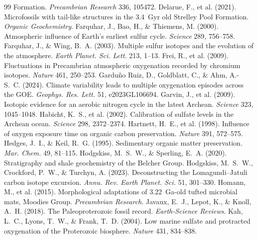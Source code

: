 \documentclass[11pt]{article}
\begin{document}
\begin{thebibliography}{99}
Formation. \textit{Precambrian Research} 336, 105472.
 Delarue, F., et al. (2021). Microfossils with tail-like
structures in the 3.4~Gyr old Strelley Pool Formation. \textit{Organic Geochemistry}.
 Farquhar, J., Bao, H., \& Thiemens, M. (2000).
Atmospheric influence of Earth's earliest sulfur cycle. \textit{Science} 289, 756--758.
 Farquhar, J., \& Wing, B.~A. (2003). Multiple sulfur
isotopes and the evolution of the atmosphere. \textit{Earth Planet. Sci. Lett.} 213, 1--13.
 Frei, R., et al. (2009). Fluctuations in Precambrian
atmospheric oxygenation recorded by chromium isotopes. \textit{Nature} 461, 250--253.
 Gardu\~{n}o Ruiz, D., Goldblatt, C., \& Ahm,
A.-S.~C. (2024). Climate variability leads to multiple oxygenation episodes across the GOE.
\textit{Geophys. Res. Lett.} 51, e2023GL106694.
 Garvin, J., et al. (2009). Isotopic evidence for an
aerobic nitrogen cycle in the latest Archean. \textit{Science} 323, 1045--1048.
 Habicht, K.~S., et al. (2002). Calibration of sulfate
levels in the Archean ocean. \textit{Science} 298, 2372--2374.
 Hartnett, H.~E., et al. (1998). Influence of oxygen
exposure time on organic carbon preservation. \textit{Nature} 391, 572--575.
 Hedges, J.~I., \& Keil, R.~G. (1995). Sedimentary organic
matter preservation. \textit{Mar. Chem.} 49, 81--115.
 Hodgskiss, M.~S.~W., \& Sperling, E.~A. (2020).
Stratigraphy and shale geochemistry of the Belcher Group.
 Hodgskiss, M.~S.~W., Crockford, P.~W., \& Turchyn,
A. (2023). Deconstructing the Lomagundi--Jatuli carbon isotope excursion. \textit{Annu. Rev. Earth
Planet. Sci.} 51, 301--330.
 Homann, M., et al. (2015). Morphological adaptations of
3.22~Ga-old tufted microbial mats, Moodies Group. \textit{Precambrian Research}.
 Javaux, E.~J., Lepot, K., \& Knoll, A.~H. (2018). The
Paleoproterozoic fossil record. \textit{Earth-Science Reviews}.
 Kah, L.~C., Lyons, T.~W., \& Frank, T.~D. (2004). Low marine
sulfate and protracted oxygenation of the Proterozoic biosphere. \textit{Nature} 431, 834--838.

\end{thebibliography}
\end{document}
